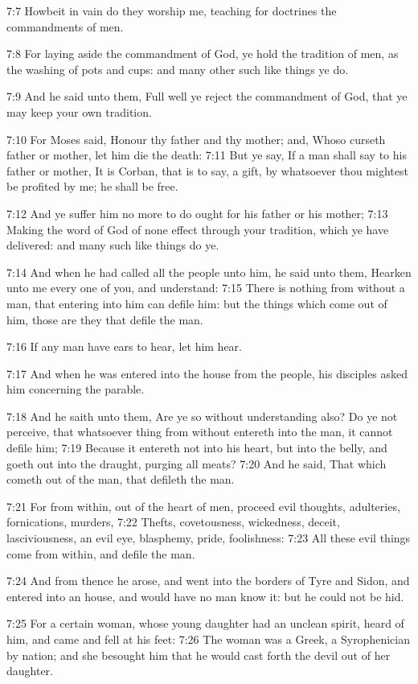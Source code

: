 7:7 Howbeit in vain do they worship me, teaching for doctrines the
commandments of men.

7:8 For laying aside the commandment of God, ye hold the tradition of
men, as the washing of pots and cups: and many other such like things
ye do.

7:9 And he said unto them, Full well ye reject the commandment of God,
that ye may keep your own tradition.

7:10 For Moses said, Honour thy father and thy mother; and, Whoso
curseth father or mother, let him die the death: 7:11 But ye say, If a
man shall say to his father or mother, It is Corban, that is to say, a
gift, by whatsoever thou mightest be profited by me; he shall be free.

7:12 And ye suffer him no more to do ought for his father or his
mother; 7:13 Making the word of God of none effect through your
tradition, which ye have delivered: and many such like things do ye.

7:14 And when he had called all the people unto him, he said unto
them, Hearken unto me every one of you, and understand: 7:15 There is
nothing from without a man, that entering into him can defile him: but
the things which come out of him, those are they that defile the man.

7:16 If any man have ears to hear, let him hear.

7:17 And when he was entered into the house from the people, his
disciples asked him concerning the parable.

7:18 And he saith unto them, Are ye so without understanding also? Do
ye not perceive, that whatsoever thing from without entereth into the
man, it cannot defile him; 7:19 Because it entereth not into his
heart, but into the belly, and goeth out into the draught, purging all
meats?  7:20 And he said, That which cometh out of the man, that
defileth the man.

7:21 For from within, out of the heart of men, proceed evil thoughts,
adulteries, fornications, murders, 7:22 Thefts, covetousness,
wickedness, deceit, lasciviousness, an evil eye, blasphemy, pride,
foolishness: 7:23 All these evil things come from within, and defile
the man.

7:24 And from thence he arose, and went into the borders of Tyre and
Sidon, and entered into an house, and would have no man know it: but
he could not be hid.

7:25 For a certain woman, whose young daughter had an unclean spirit,
heard of him, and came and fell at his feet: 7:26 The woman was a
Greek, a Syrophenician by nation; and she besought him that he would
cast forth the devil out of her daughter.


